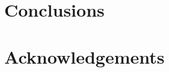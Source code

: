\documentclass[aps,%
twocolumn,%
floatfix,%
pra,%
amsfonts,%
longbibliography,%
groupedaddress,%
superscriptaddress]{revtex4-2}%
\newcommand{\1}{\mathbbm{1}}
\begin{document}
\section{Conclusions}



\section*{Acknowledgements} 







\makeatletter
\newcommand{\appendixtitle}[1]{\gdef\@title{#1}}
\newcommand{\appendixauthor}[1]{\gdef\@author{#1}}
\newcommand{\appendixaffiliation}[1]{\gdef\@affiliation{#1}}
\newcommand{\appendixdate}[1]{\gdef\@date{#1}}
\makeatother

\makeatletter%
\newcommand{\appendixmaketitle}{%
\begin{center}%
\vspace{0.4in}%
{\Large \@title \par}%
\end{center}%
\par%
}%
\makeatother%
\end{document}
